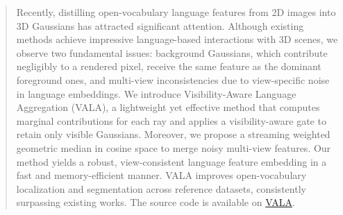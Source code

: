 \begin{abstract}
Recently, distilling open-vocabulary language features from 2D images into 3D Gaussians has attracted significant attention. Although existing methods achieve impressive language-based interactions with 3D scenes, we observe two fundamental issues: background Gaussians, which contribute negligibly to a rendered pixel, receive the same feature as the dominant foreground ones, and multi-view inconsistencies due to view-specific noise in language embeddings. We introduce Visibility-Aware Language Aggregation (VALA), a lightweight yet effective method that computes marginal contributions for each ray and applies a visibility-aware gate to retain only visible Gaussians. Moreover, we propose a streaming weighted geometric median in cosine space to merge noisy multi-view features. Our method yields a robust, view-consistent language feature embedding in a fast and memory-efficient manner. VALA improves open-vocabulary localization and segmentation across reference datasets, consistently surpassing existing works. The source code is available on \href{https://github.com/changandao/VALA}{VALA}.
\end{abstract}